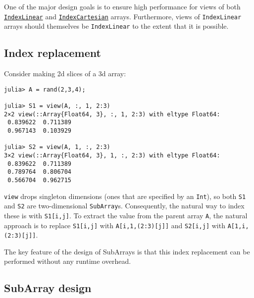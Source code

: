 One of the major design goals is to ensure high performance for views of both \hyperlink{1761039776681330940}{\texttt{IndexLinear}} and \hyperlink{4052302263500310575}{\texttt{IndexCartesian}} arrays. Furthermore, views of \texttt{IndexLinear} arrays should themselves be \texttt{IndexLinear} to the extent that it is possible.



\hypertarget{5581126844733696350}{}


\subsection{Index replacement}



Consider making 2d slices of a 3d array:






\begin{verbatim}
julia> A = rand(2,3,4);

julia> S1 = view(A, :, 1, 2:3)
2×2 view(::Array{Float64, 3}, :, 1, 2:3) with eltype Float64:
 0.839622  0.711389
 0.967143  0.103929

julia> S2 = view(A, 1, :, 2:3)
3×2 view(::Array{Float64, 3}, 1, :, 2:3) with eltype Float64:
 0.839622  0.711389
 0.789764  0.806704
 0.566704  0.962715
\end{verbatim}





\texttt{view} drops {\textquotedbl}singleton{\textquotedbl} dimensions (ones that are specified by an \texttt{Int}), so both \texttt{S1} and \texttt{S2} are two-dimensional \texttt{SubArray}s. Consequently, the natural way to index these is with \texttt{S1[i,j]}. To extract the value from the parent array \texttt{A}, the natural approach is to replace \texttt{S1[i,j]} with \texttt{A[i,1,(2:3)[j]]} and \texttt{S2[i,j]} with \texttt{A[1,i,(2:3)[j]]}.



The key feature of the design of SubArrays is that this index replacement can be performed without any runtime overhead.



\hypertarget{2778530023624514912}{}


\subsection{SubArray design}



